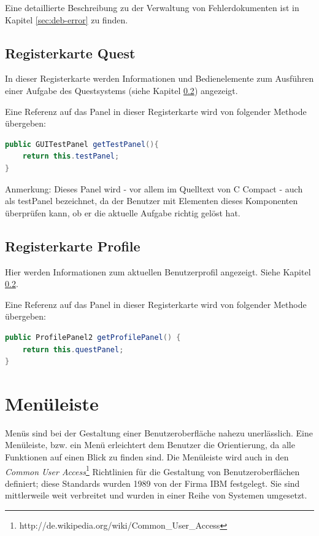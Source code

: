 Eine detaillierte Beschreibung zu der Verwaltung von Fehlerdokumenten ist in Kapitel \ref{sec:deb-error} zu finden.

\subsection{Registerkarte \glqq{}Quest\grqq{}}
In dieser Registerkarte werden Informationen und Bedienelemente zum Ausführen einer Aufgabe des Questsystems (siehe Kapitel \ref{}) angezeigt.

Eine Referenz auf das Panel in dieser Registerkarte wird von folgender Methode übergeben:
\begin{lstlisting}[language=JAVA]
public GUITestPanel getTestPanel(){
	return this.testPanel;
}
\end{lstlisting}

Anmerkung: Dieses Panel wird - vor allem im Quelltext von C Compact - auch als \glqq{}testPanel\grqq{} bezeichnet, da der Benutzer mit Elementen dieses Komponenten überprüfen kann, ob er die aktuelle Aufgabe richtig gelöst hat.

\subsection{Registerkarte \glqq{}Profile\grqq{}}
Hier werden Informationen zum aktuellen Benutzerprofil angezeigt. Siehe Kapitel \ref{}.

Eine Referenz auf das Panel in dieser Registerkarte wird von folgender Methode übergeben:
\begin{lstlisting}[language=JAVA]
public ProfilePanel2 getProfilePanel() {
	return this.questPanel;
}
\end{lstlisting}

\section{Menüleiste}
\label{sec:gui-main-menu}
Menüs sind bei der Gestaltung einer Benutzeroberfläche nahezu unerlässlich. Eine Menüleiste, bzw. ein Menü erleichtert dem Benutzer die Orientierung, da alle Funktionen auf einen Blick zu finden sind. Die Menüleiste wird auch in den \emph{Common User Access}\footnote{http://de.wikipedia.org/wiki/Common\_User\_Access} Richtlinien für die Gestaltung von Benutzeroberflächen definiert; diese Standards wurden 1989 von der Firma IBM festgelegt. Sie sind mittlerweile weit verbreitet und wurden in einer Reihe von Systemen umgesetzt.

